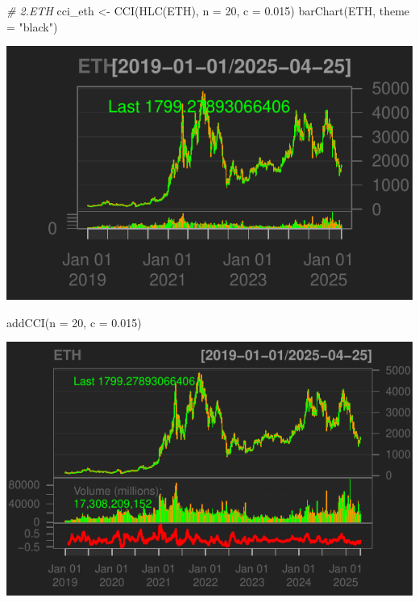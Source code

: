 \documentclass[]{tufte-handout}
\newenvironment{Shaded}{}{}
\newcommand{\AttributeTok}[1]{\textcolor[rgb]{0.49,0.56,0.16}{#1}}
\newcommand{\CommentTok}[1]{\textcolor[rgb]{0.38,0.63,0.69}{\textit{#1}}}
\newcommand{\DecValTok}[1]{\textcolor[rgb]{0.25,0.63,0.44}{#1}}
\newcommand{\FloatTok}[1]{\textcolor[rgb]{0.25,0.63,0.44}{#1}}
\newcommand{\FunctionTok}[1]{\textcolor[rgb]{0.02,0.16,0.49}{#1}}
\newcommand{\NormalTok}[1]{#1}
\newcommand{\OtherTok}[1]{\textcolor[rgb]{0.00,0.44,0.13}{#1}}
\newcommand{\StringTok}[1]{\textcolor[rgb]{0.25,0.44,0.63}{#1}}
\begin{document}
\begin{Shaded}
\begin{Highlighting}[]
\CommentTok{\# 2.ETH}
\NormalTok{cci\_eth }\OtherTok{\textless{}{-}} \FunctionTok{CCI}\NormalTok{(}\FunctionTok{HLC}\NormalTok{(ETH), }\AttributeTok{n =} \DecValTok{20}\NormalTok{, }\AttributeTok{c =} \FloatTok{0.015}\NormalTok{)}
\FunctionTok{barChart}\NormalTok{(ETH, }\AttributeTok{theme =} \StringTok{"black"}\NormalTok{)}
\end{Highlighting}
\end{Shaded}

\includegraphics{cripto_update_files/figure-latex/unnamed-chunk-12-3}

\begin{Shaded}
\begin{Highlighting}[]
\FunctionTok{addCCI}\NormalTok{(}\AttributeTok{n =} \DecValTok{20}\NormalTok{, }\AttributeTok{c =} \FloatTok{0.015}\NormalTok{)}
\end{Highlighting}
\end{Shaded}

\includegraphics{cripto_update_files/figure-latex/unnamed-chunk-12-4}
\end{document}
